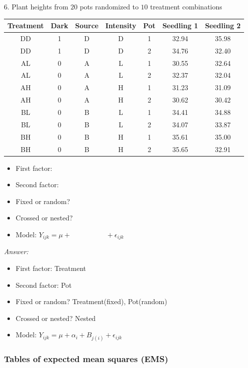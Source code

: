 6. Plant heights from $20$ pots randomized to $10$ treatment combinations
\begin{table}[H]
	\renewcommand{\arraystretch}{1.5}
	\centering
	\begin{tabular}{ccccc|cc}
		Treatment & Dark & Source & Intensity & Pot & Seedling 1 & Seedling 2\\
		\hline
		DD & 1 & D & D & 1 & 32.94 & 35.98\\
		DD & 1 & D & D & 2 & 34.76 & 32.40\\
		AL & 0 & A & L & 1 & 30.55 & 32.64\\
		AL & 0 & A & L & 2 & 32.37 & 32.04\\
		AH & 0 & A & H & 1 & 31.23 & 31.09\\
		AH & 0 & A & H & 2 & 30.62 & 30.42\\
		BL & 0 & B & L & 1 & 34.41 & 34.88\\
		BL & 0 & B & L & 2 & 34.07 & 33.87\\
		BH & 0 & B & H & 1 & 35.61 & 35.00\\
		BH & 0 & B & H & 2 & 35.65 & 32.91\\
		\bottomrule
	\end{tabular}
\end{table}

\begin{itemize}
	\item First factor:  
	\item Second factor: 
	\item Fixed or random?  
	\item Crossed or nested?
	\item Model:  $Y_{ijk} = \mu  + \quad \quad \quad \quad \quad  + \epsilon_{ijk}$
\end{itemize}

{\it Answer:}\\
\begin{pf}
	\begin{itemize}
		\item First factor:  Treatment
		\item Second factor: Pot
		\item Fixed or random?  Treatment(fixed), Pot(random)
		\item Crossed or nested?  Nested
		\item Model:   $Y_{ijk} = \mu + \alpha_i + B_{j(i)}  + \epsilon_{ijk}$ 
	\end{itemize}
\end{pf}


\subsubsection*{Tables of expected mean squares (EMS)}

